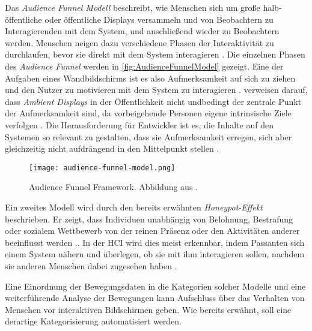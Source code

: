 Das \emph{Audience Funnel Modell} \citep{wouters_uncovering_2016, mai_audience_2018} beschreibt,
wie Menschen sich um große halb-öffentliche oder öffentliche Displays versammeln
und von Beobachtern zu Interagierenden mit dem System, und anschließend wieder zu Beobachtern werden.
Menschen neigen dazu verschiedene Phasen der Interaktivität zu durchlaufen,
bevor sie direkt mit dem System interagieren \citep{wouters_uncovering_2016, mai_audience_2018}.
Die einzelnen Phasen des \emph{Audience Funnel} werden in \autoref{fig:AudienceFunnelModel} gezeigt.
Eine der Aufgaben eines Wandbildschirms ist es also Aufmerksamkeit auf sich zu ziehen
und den Nutzer zu motivieren mit dem System zu interagieren \citep{mai_audience_2018}.
\citet{mai_audience_2018} verweisen darauf, dass \emph{Ambient Displays} in der Öffentlichkeit
nicht undbedingt der zentrale Punkt der Aufmerksamkeit sind, da vorbeigehende Personen eigene intrinsische Ziele verfolgen \citep{mai_audience_2018}.
Die Herausforderung für Entwickler ist es, die Inhalte auf den Systemen so relevant zu gestalten,
dass sie Aufmerksamkeit erregen, sich aber gleichzeitig nicht aufdrängend in den Mittelpunkt stellen \citep{mai_audience_2018}.
\begin{figure}[ht]
    \begin{center}
    \texttt{[image: audience-funnel-model.png]}
    \end{center}
    \caption{Audience Funnel Framework. Abbildung aus \citet{mai_audience_2018}.}
    \label{fig:AudienceFunnelModel}
  \end{figure}

Ein zweites Modell wird durch den bereits erwähnten \emph{Honeypot-Effekt} beschrieben.
Er zeigt, dass Individuen unabhängig von Belohnung, Bestrafung oder sozialem Wettbewerb
von der reinen Präsenz oder den Aktivitäten anderer beeinflusst werden \citep{wouters_uncovering_2016}..
In der \ac{HCI} wird dies meist erkennbar, indem Passanten sich einem System nähern
und überlegen, ob sie mit ihm interagieren sollen,
nachdem sie anderen Menschen dabei zugesehen haben \citep{wouters_uncovering_2016}.

Eine Einordnung der Bewegungsdaten in die Kategorien solcher Modelle
und eine weiterführende Analyse der Bewegungen kann Aufschluss über das Verhalten von Menschen
vor interaktiven Bildschirmen geben.
Wie bereits erwähnt, soll eine derartige Kategorisierung automatisiert werden.

